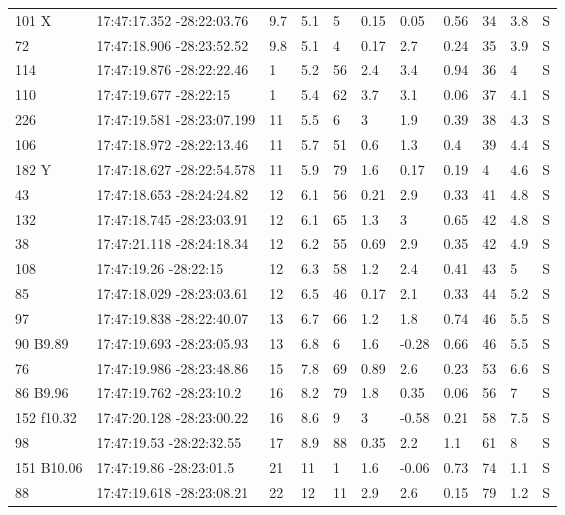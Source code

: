 \begin{deluxetable}[htp]
\begin{tabular}{lllllllllll}
101 X & 17:47:17.352 -28:22:03.76 & 9.7 & 5.1 & 5 & 0.15 & 0.05 & 0.56 & 34 & 3.8\ee{25} & S \\
72 & 17:47:18.906 -28:23:52.52 & 9.8 & 5.1 & 4 & 0.17 & 2.7 & 0.24 & 35 & 3.9\ee{25} & S \\
114 & 17:47:19.876 -28:22:22.46 & 1 & 5.2 & 56 & 2.4 & 3.4 & 0.94 & 36 & 4\ee{25} & S \\
110 & 17:47:19.677 -28:22:15 & 1 & 5.4 & 62 & 3.7 & 3.1 & 0.06 & 37 & 4.1\ee{25} & S \\
226 & 17:47:19.581 -28:23:07.199 & 11 & 5.5 & 6 & 3 & 1.9 & 0.39 & 38 & 4.3\ee{25} & S \\
106 & 17:47:18.972 -28:22:13.46 & 11 & 5.7 & 51 & 0.6 & 1.3 & 0.4 & 39 & 4.4\ee{25} & S \\
182 Y & 17:47:18.627 -28:22:54.578 & 11 & 5.9 & 79 & 1.6 & 0.17 & 0.19 & 4 & 4.6\ee{25} & S \\
43 & 17:47:18.653 -28:24:24.82 & 12 & 6.1 & 56 & 0.21 & 2.9 & 0.33 & 41 & 4.8\ee{25} & S \\
132 & 17:47:18.745 -28:23:03.91 & 12 & 6.1 & 65 & 1.3 & 3 & 0.65 & 42 & 4.8\ee{25} & S \\
38 & 17:47:21.118 -28:24:18.34 & 12 & 6.2 & 55 & 0.69 & 2.9 & 0.35 & 42 & 4.9\ee{25} & S \\
108 & 17:47:19.26 -28:22:15 & 12 & 6.3 & 58 & 1.2 & 2.4 & 0.41 & 43 & 5\ee{25} & S \\
85 & 17:47:18.029 -28:23:03.61 & 12 & 6.5 & 46 & 0.17 & 2.1 & 0.33 & 44 & 5.2\ee{25} & S \\
97 & 17:47:19.838 -28:22:40.07 & 13 & 6.7 & 66 & 1.2 & 1.8 & 0.74 & 46 & 5.5\ee{25} & S \\
90 B9.89 & 17:47:19.693 -28:23:05.93 & 13 & 6.8 & 6 & 1.6 & -0.28 & 0.66 & 46 & 5.5\ee{25} & S \\
76 & 17:47:19.986 -28:23:48.86 & 15 & 7.8 & 69 & 0.89 & 2.6 & 0.23 & 53 & 6.6\ee{25} & S \\
86 B9.96 & 17:47:19.762 -28:23:10.2 & 16 & 8.2 & 79 & 1.8 & 0.35 & 0.06 & 56 & 7\ee{25} & S \\
152 f10.32 & 17:47:20.128 -28:23:00.22 & 16 & 8.6 & 9 & 3 & -0.58 & 0.21 & 58 & 7.5\ee{25} & S \\
98 & 17:47:19.53 -28:22:32.55 & 17 & 8.9 & 88 & 0.35 & 2.2 & 1.1 & 61 & 8\ee{25} & S \\
151 B10.06 & 17:47:19.86 -28:23:01.5 & 21 & 11 & 1 & 1.6 & -0.06 & 0.73 & 74 & 1.1\ee{26} & S \\
88 & 17:47:19.618 -28:23:08.21 & 22 & 12 & 11 & 2.9 & 2.6 & 0.15 & 79 & 1.2\ee{26} & S \\

\end{tabular}
\end{deluxetable}
